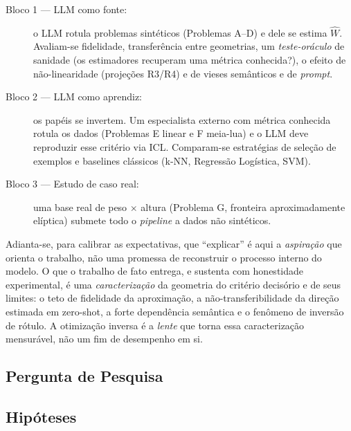 \documentclass[12pt,a4paper]{article}
\newcommand{\West}{\ensuremath{\hat{W}}}   %
\begin{document}
\begin{description}
  \item[Bloco 1 — LLM como fonte:] o LLM rotula problemas sintéticos (Problemas A–D) e
    dele se estima \West{}. Avaliam-se fidelidade, transferência entre geometrias, um
    \emph{teste-oráculo} de sanidade (os estimadores recuperam uma métrica conhecida?),
    o efeito de não-linearidade (projeções R3/R4) e de vieses semânticos e de \emph{prompt}.
  \item[Bloco 2 — LLM como aprendiz:] os papéis se invertem. Um especialista externo com
    métrica conhecida rotula os dados (Problemas E linear e F meia-lua) e o LLM deve
    reproduzir esse critério via ICL. Comparam-se estratégias de seleção de exemplos e
    baselines clássicos (k-NN, Regressão Logística, SVM).
  \item[Bloco 3 — Estudo de caso real:] uma base real de peso $\times$ altura (Problema G,
    fronteira aproximadamente elíptica) submete todo o \emph{pipeline} a dados não
    sintéticos.
\end{description}

Adianta-se, para calibrar as expectativas, que ``explicar'' é aqui a \emph{aspiração} que
orienta o trabalho, não uma promessa de reconstruir o processo interno do modelo. O que o
trabalho de fato entrega, e sustenta com honestidade experimental, é uma \emph{caracterização}
da geometria do critério decisório e de seus limites: o teto de fidelidade da aproximação, a
não-transferibilidade da direção estimada em zero-shot, a forte dependência semântica e o
fenômeno de inversão de rótulo. A otimização inversa é a \emph{lente} que torna essa
caracterização mensurável, não um fim de desempenho em si.

\subsection*{Pergunta de Pesquisa}

\begin{center}
\end{center}

\subsection*{Hipóteses}
\end{document}
